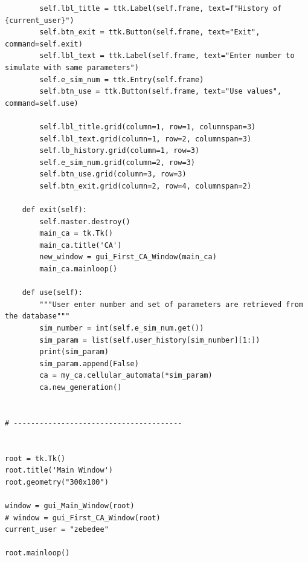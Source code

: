 \documentclass[11pt, a4paper]{article}
\begin{document}
\begin{lstlisting}
        self.lbl_title = ttk.Label(self.frame, text=f"History of {current_user}")
        self.btn_exit = ttk.Button(self.frame, text="Exit", command=self.exit)
        self.lbl_text = ttk.Label(self.frame, text="Enter number to simulate with same parameters")
        self.e_sim_num = ttk.Entry(self.frame)
        self.btn_use = ttk.Button(self.frame, text="Use values", command=self.use)

        self.lbl_title.grid(column=1, row=1, columnspan=3)
        self.lbl_text.grid(column=1, row=2, columnspan=3)
        self.lb_history.grid(column=1, row=3)
        self.e_sim_num.grid(column=2, row=3)
        self.btn_use.grid(column=3, row=3)
        self.btn_exit.grid(column=2, row=4, columnspan=2)

    def exit(self):
        self.master.destroy()
        main_ca = tk.Tk()
        main_ca.title('CA')
        new_window = gui_First_CA_Window(main_ca)
        main_ca.mainloop()

    def use(self):
        """User enter number and set of parameters are retrieved from the database"""
        sim_number = int(self.e_sim_num.get())
        sim_param = list(self.user_history[sim_number][1:])
        print(sim_param)
        sim_param.append(False)
        ca = my_ca.cellular_automata(*sim_param)
        ca.new_generation()


# ---------------------------------------


root = tk.Tk()
root.title('Main Window')
root.geometry("300x100")

window = gui_Main_Window(root)
# window = gui_First_CA_Window(root)
current_user = "zebedee"

root.mainloop()

\end{lstlisting}
\end{document}

